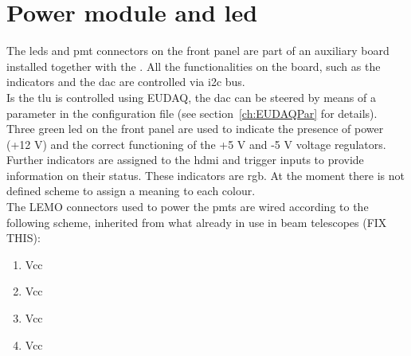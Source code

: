 \section{Power module and led}\label{ch:frontpanel}
The \gls{led}s and \gls{pmt} connectors on the front panel are part of an auxiliary board installed together with the \brd. All the functionalities on the board, such as the indicators and the \gls{dac} are controlled via \gls{i2c} bus.\\
Is the \gls{tlu} is controlled using EUDAQ, the \gls{dac} can be steered by means of a parameter in the configuration file (see section~\ref{ch:EUDAQPar} for details).\\
Three green \gls{led} on the front panel are used to indicate the presence of power (+12 V) and the correct functioning of the +5 V and -5 V voltage regulators. Further indicators are assigned to the \gls{hdmi} and trigger inputs to provide information on their status. These indicators are \gls{rgb}. At the moment there is not defined scheme to assign a meaning to each colour.\\
The LEMO connectors used to power the \gls{pmt}s are wired according to the following scheme, inherited from what already in use in beam telescopes (FIX THIS):
\begin{enumerate}
  \item Vcc
  \item Vcc
  \item Vcc
  \item Vcc
\end{enumerate}
